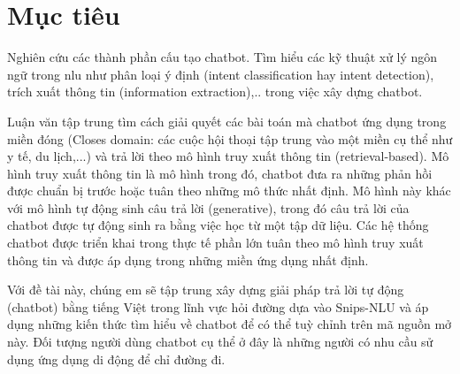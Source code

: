 \section{Mục tiêu}

Nghiên cứu các thành phần cấu tạo chatbot. Tìm hiểu các kỹ thuật xử lý ngôn ngữ trong \ac{nlu} như phân loại ý định (intent classification hay intent detection), trích xuất thông tin (information extraction),.. trong việc xây dựng chatbot.

Luận văn tập trung tìm cách giải quyết các bài toán mà chatbot ứng dụng trong miền đóng (Closes domain: các cuộc hội thoại tập trung vào một miền cụ thể như y tế, du lịch,...) và trả lời theo mô hình truy xuất thông tin (retrieval-based). Mô hình truy xuất thông tin là mô hình trong đó, chatbot đưa ra những phản hồi được chuẩn bị trước hoặc tuân theo những mô thức nhất định. Mô hình này khác với mô hình tự động sinh câu trả lời (generative), trong đó câu trả lời của chatbot được tự động sinh ra bằng việc học từ một tập dữ liệu. Các hệ thống chatbot được triển khai trong thực tế phần lớn tuân theo mô hình truy xuất thông tin và được áp dụng trong những miền ứng dụng nhất định.

Với đề tài này, chúng em sẽ tập trung xây dựng giải pháp trả lời tự động (chatbot) bằng tiếng Việt trong lĩnh vực hỏi đường dựa vào Snips-NLU và áp dụng những kiến thức tìm hiểu về chatbot để có thể tuỳ chỉnh trên mã nguồn mở này. Đối tượng người dùng chatbot cụ thể ở đây là những người có nhu cầu sử dụng ứng dụng di động để chỉ đường đi.

